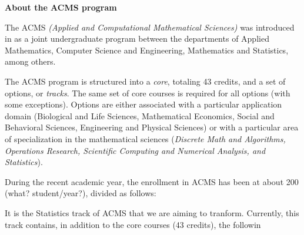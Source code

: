 {\bf About the ACMS program}

The ACMS {\em (Applied and Computational Mathematical Sciences)} was
introduced in  as a joint undergraduate program between the
departments of Applied Mathematics, Computer Science and Engineering,
Mathematics and Statistics, among others.

The ACMS program is structured into a {\em core}, totaling 43 credits,
and a set of options, or {\em tracks}. The same set of core courses is
required for all options (with some exceptions). Options are either
associated with a particular application domain (Biological and Life
Sciences, Mathematical Economics, Social and Behavioral Sciences,
Engineering and Physical Sciences) or with a particular area of
specialization in the mathematical sciences ({\em Discrete Math and
  Algorithms, Operations Research, Scientific Computing and Numerical
  Analysis, and Statistics}). 

During the recent academic year, the enrollment in ACMS has been at
about 200 (what? student/year?), divided as follows: 


It is the Statistics track of ACMS that we are aiming to tranform. Currently, this track contains, in addition to the core courses (43 credits), the followin

